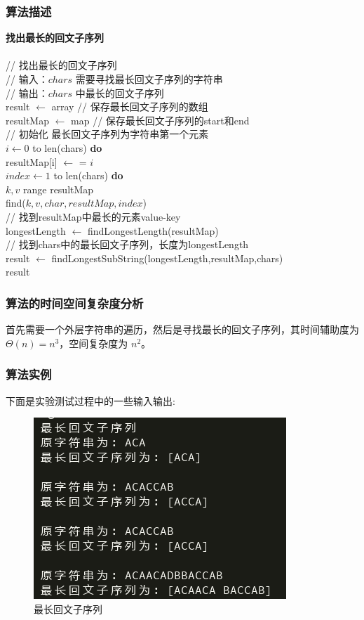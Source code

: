 \documentclass{ctexart}
\newcommand\tab[1][1cm]{\hspace*{#1}}
\begin{document}
\subsubsection{算法描述 }
   {\bfseries 找出最长的回文子序列} \\
	\tab{\bfseries{算法 find$(chars)$ }} \\
	\tab// 找出最长的回文子序列 \\
	\tab// 输入：$chars$ 需要寻找最长回文子序列的字符串\\
	\tab// 输出：$chars$ 中最长的回文子序列\\
	\tab result $\leftarrow$ array // 保存最长回文子序列的数组\\
	\tab resultMap $\leftarrow$ map // 保存最长回文子序列的start和end \\
	\tab // 初始化 最长回文子序列为字符串第一个元素 \\
	\tab{\bfseries for} $i \leftarrow 0$ to len(chars) {\bfseries do} \\
	\tab\tab resultMap[i] $\leftarrow $ = $i$ \\
	\tab{\bfseries for} $index \leftarrow 1$ to len(chars) {\bfseries do} \\
	\tab\tab{\bfseries for} $k,v $ range resultMap \\
	\tab\tab find($k,v,char,resultMap,index$) \\
	\tab// 找到resultMap中最长的元素value-key\\
	\tab longestLength $\leftarrow$ findLongestLength(resultMap) \\
	\tab// 找到chars中的最长回文子序列，长度为longestLength\\
	\tab result $\leftarrow$ findLongestSubString(longestLength,resultMap,chars) \\
	\tab{\bfseries return} result
\subsubsection{算法的时间空间复杂度分析 }
首先需要一个外层字符串的遍历，然后是寻找最长的回文子序列，其时间辅助度为
$\Theta(n) = n^3$，空间复杂度为 $n^2$。
\subsubsection{算法实例}
下面是实验测试过程中的一些输入输出:
\begin{figure}[H]
	\centering
	\includegraphics[scale=0.6]{../images/max_huiwen.png}
	\caption{最长回文子序列}
\end{figure}
\end{document}
